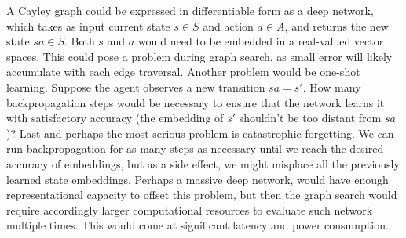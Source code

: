 \documentclass[12pt]{article}
\begin{document}
A Cayley graph could be expressed in differentiable form as a deep network, which takes as input current state $s\in S$ and action $a\in A$, and returns the new state $sa\in S$.  Both $s$ and $a$ would need to be embedded in a real-valued vector spaces. This could pose a problem during graph search, as small error will likely accumulate with each edge traversal. Another problem would be one-shot learning. Suppose the agent observes a new transition $sa=s'$. How many backpropagation steps would be necessary to ensure that the network learns it with satisfactory accuracy (the embedding of $s'$ shouldn't be too distant from $sa$)? Last and perhaps the most serious problem is catastrophic forgetting. We can run backpropagation for as many steps as necessary until we reach the desired accuracy of embeddings, but as a side effect, we might misplace all the previously learned state embeddings. Perhaps a massive deep network, would have enough representational capacity to offset this problem, but then the graph search would require accordingly larger computational resources to evaluate such network multiple times. This would come at significant latency and power consumption. 
\end{document}
